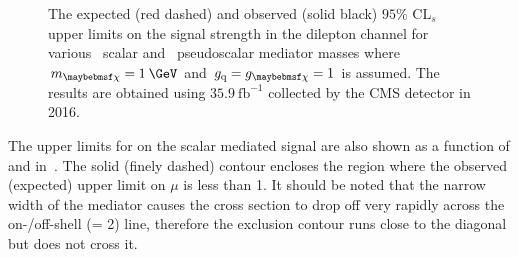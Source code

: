 \begin{figure}
  \centering
  \hspace{1 cm}
  \caption{The expected (red dashed) and observed (solid black) $95\%$ $\textrm{CL}_{s}$ upper limits on the \ttDM signal strength in the dilepton channel for various~\protect{} scalar and~\protect{} pseudoscalar mediator masses where $\mDM=1\:\GeV$ and $\gq = \gDM = 1$ is assumed. The results are obtained using $35.9\:\textrm{fb}^{-1}$ collected by the CMS detector in 2016.}
\end{figure}

The upper limits for on the scalar mediated \ttDM signal are also shown as a function of \mMed and \mDM in~. The solid (finely dashed) contour encloses the region where the observed (expected) upper limit on $\mu$ is less than 1. It should be noted that the narrow width of the mediator causes the cross section to drop off very rapidly across the on-/off-shell (\mMed = 2\mDM) line, therefore the exclusion contour runs close to the diagonal but does not cross it.

